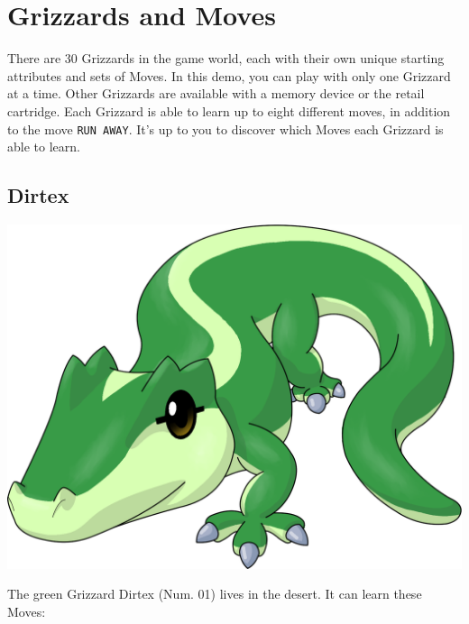 \documentclass[10pt,twocolumn,openany,article]{memoir}
\begin{document}
\fi

\fi %

\ifdefined\ATARIAGESAVE
\vfill
\fi

\chapter{Grizzards and Moves}\label{ch:Grizzards}

There are  30 Grizzards in  the game world,  each with their  own unique
starting attributes and  sets of Moves. \ifdefined\NOSAVE  In this demo,
you  can play  with only  one Grizzard  at a  time. Other  Grizzards are
available  with  a memory  device  or  the  retail cartridge.  \fi  Each
Grizzard is able  to learn up to  eight different moves, in  addition to the
move \texttt{RUN  AWAY}. It's  up to  you to  discover which  Moves each
Grizzard is able to learn.

\ifdefined\ATARIAGESAVE
\vfill
\fi

\ifdefined\DEMO\else

\pagebreak

\section{Dirtex}

\begin{center}
  \includegraphics[width=\columnwidth]{../Manual/Dirtex.png}
\end{center}

The green  Grizzard Dirtex (Num. 01)  lives in the desert.  It can learn
these Moves:
\end{document}
